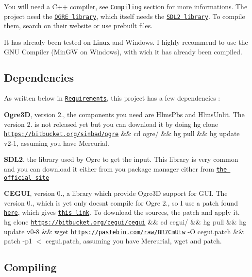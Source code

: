 You will need a C++ compiler, see \href{#compiling}{\tt Compiling} section for more informations. The project need the \href{http://ogre3d.org}{\tt O\+G\+RE library}, which itself needs the \href{http://libsdl.org/}{\tt S\+D\+L2 library}. To compile them, search on their website or use prebuilt files.

It has already been tested on Linux and Windows. I highly recommend to use the G\+NU Compiler (Min\+GW on Windows), with wich it has already been compiled.

\subsection*{Dependencies}

As written below in \href{#requirement}{\tt Requirements}, this project has a few dependencies \+:
\begin{DoxyItemize}
\item {\bfseries Ogre3D}, version 2., the components you need are Hlms\+Pbs and Hlms\+Unlit. The version 2. is not released yet but you can download it by doing {\ttfamily hg clone \href{https://bitbucket.org/sinbad/ogre}{\tt https\+://bitbucket.\+org/sinbad/ogre} \&\& cd ogre/ \&\& hg pull \&\& hg update v2-\/1}, assuming you have Mercurial.
\item {\bfseries S\+D\+L2}, the library used by Ogre to get the input. This library is very common and you can download it either from you package manager either from \href{http://libsdl.org/}{\tt the official site}
\item {\bfseries C\+E\+G\+UI}, version 0., a library which provide Ogre3D support for G\+UI. The version 0., which is yet only doesn\textquotesingle{}t compile for Ogre 2., so I use a patch found \href{http://www.ogre3d.org/forums/viewtopic.php?f=25&t=82911&start=25}{\tt here}, which gives \href{https://pastebin.com/BB7CmUtw}{\tt this link}. To download the sources, the patch and apply it. {\ttfamily hg clone \href{https://bitbucket.org/cegui/cegui}{\tt https\+://bitbucket.\+org/cegui/cegui} \&\& cd cegui/ \&\& hg pull \&\& hg update v0-\/8 \&\& wget \href{https://pastebin.com/raw/BB7CmUtw}{\tt https\+://pastebin.\+com/raw/\+B\+B7\+Cm\+Utw} -\/O cegui.\+patch \&\& patch -\/p1 $<$ cegui.\+patch}, assuming you have Mercurial, wget and patch.
\end{DoxyItemize}

\subsection*{Compiling}

